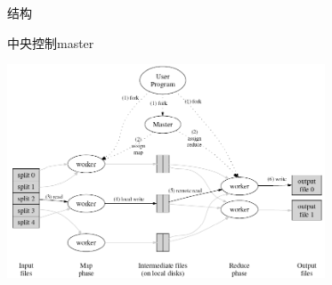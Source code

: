 \documentclass{beamer}
\begin{document}
\begin{frame}{结构}
    \begin{block}{中央控制master} \begin{center}
    \includegraphics[height=180pt]{keyan/mapreduce2.png}\\
    \end{center}\end{block}
\end{frame}
\end{document}

